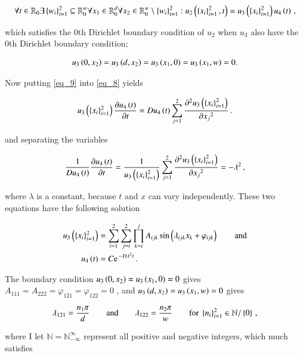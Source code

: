 \documentclass[11pt,english,a4paper]{article}
\begin{document}
\begin{flushleft}
\begin{align}
\forall t\in \mathbb{R}_0\exists\left\lbrace{w_i}\right\rbrace_{i=1}^2\subseteq \mathbb{R}_0^w \forall x_1\in \mathbb{R}_{0}^d \forall x_2\in\mathbb{R}_0^w \setminus \left\lbrace{w_i}\right\rbrace_{i=1}^2 : u_2\left({\left\lbrace{x_i}\right\rbrace_{i=1}^2,t}\right) = u_3\left({\left\lbrace{x_i}\right\rbrace_{i=1}^2}\right)u_4\left({t}\right) \,,
\label{eq_9}
\end{align}

which satisfies the 0th Dirichlet boundary condition of $u_2$ when $u_3$ also have the 0th Dirichlet boundary condition;

\begin{align*}
u_3\left({0,x_2}\right)=u_3\left({d,x_2}\right)=u_3\left({x_1,0}\right)=u_3\left({x_1,w}\right)=0.
\end{align*}

Now putting \eqref{eq_9} into \eqref{eq_8} yields

\begin{align*}
u_3\left({\left\lbrace{x_i}\right\rbrace_{i=1}^2}\right)\frac{\partial u_4\left({t}\right)}{\partial t} = Du_4\left({t}\right)\sum_{j=1}^2\frac{\partial^2 u_3\left({\left\lbrace{x_i}\right\rbrace_{i=1}^2}\right)}{\partial {x_j}^2} \,.
\end{align*}

and separating the variables

\begin{align*}
\frac{1}{Du_4\left({t}\right)} \frac{\partial u_4\left({t}\right)}{\partial t} = \frac{1}{u_3\left({\left\lbrace{x_i}\right\rbrace_{i=1}^2}\right)}\sum_{j=1}^2\frac{\partial^2 u_3\left({\left\lbrace{x_i}\right\rbrace_{i=1}^2}\right)}{\partial {x_j}^2} = -\lambda^2 \,,
\end{align*}

where $\lambda$ is a constant, because $t$ and $x$ can vary independently. These two equations have the following solution

\begin{align*}
u_3\p{\kr{x_i}_{i=1}^2} &= \sum_{i=1}^2\sum_{j=i}^2 \prod_{k=i}^j A_{ijk} \sin\p{\lambda_{ijk} x_k + \varphi_{ijk}} \qquad \text{and}
\\
u_4\p{t} &= C\e^{-D\lambda^2 t}\,.
\end{align*}

The boundary condition $u_3\left({0,x_2}\right)=u_3\left({x_1,0}\right)=0$ gives $A_{111} = A_{222} = \varphi_{121}=\varphi_{122}=0$ , and $u_3\left({d,x_2}\right)=u_3\left({x_1,w}\right)=0$ gives 

\begin{align*}
\lambda_{121} = \frac{n_1\pi}{d}  \qquad \text{and} \qquad \lambda_{122} = \frac{n_2\pi}{w} \qquad \text{for } \left\lbrace{n_i}\right\rbrace_{i=1}^2 \in \mathbb{N}/\left\lbrace{0}\right\rbrace\,,
\end{align*}

where I let $\mathbb{N}=\mathbb{N}_{-\infty}^{\infty}$ represent all positive and negative integers, which much satisfies


\end{flushleft}
\end{document}
